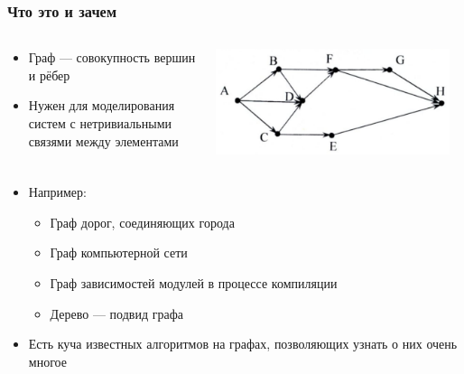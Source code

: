 \documentclass{../../slides-style}
\begin{document}
    
    \begin{frame}[plain]
        \titlepage
    \end{frame}

    \begin{frame}
        \frametitle{Что это и зачем}
        \begin{columns}
            \begin{column}{0.4\textwidth}
                \begin{itemize}
                    \item Граф --- совокупность вершин и рёбер
                    \item Нужен для моделирования систем с нетривиальными связями между элементами
                \end{itemize}
            \end{column}
            \begin{column}{0.6\textwidth}
                \begin{center}
                    \includegraphics[width=0.95\textwidth]{graph.png}
                \end{center}
            \end{column}
        \end{columns}
        \begin{itemize}
            \item Например:
            \begin{itemize}
                \item Граф дорог, соединяющих города
                \item Граф компьютерной сети
                \item Граф зависимостей модулей в процессе компиляции
                \item Дерево --- подвид графа
            \end{itemize}
            \item Есть куча известных алгоритмов на графах, позволяющих узнать о них очень многое
        \end{itemize}
    \end{frame}
\end{document}
